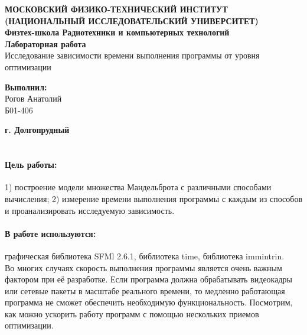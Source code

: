 \documentclass[12pt, letterpaper]{article}
\begin{document}
    \begin{titlepage}
        \begin{center}
            \large\textbf{МОСКОВСКИЙ ФИЗИКО-ТЕХНИЧЕСКИЙ ИНСТИТУТ (НАЦИОНАЛЬНЫЙ ИССЛЕДОВАТЕЛЬСКИЙ УНИВЕРСИТЕТ)}\\
            \large\textbf{Физтех-школа Радиотехники и компьютерных технологий}\\
            \vspace{8cm} 
            \Large\textbf{Лабораторная работа}\\
            \large{Исследование зависимости времени выполнения программы от уровня оптимизации}\\
            \vspace{5cm}
        \end{center}
        \begin{flushright}
            \large\textbf{Выполнил:}\\
            \large{Рогов Анатолий}\\
            \large{Б01-406}\\
        \end{flushright}
        \begin{center}
            \vfill
            \large\textbf{г. Долгопрудный}\\
            \large\textbf{\the \year}\\
        \end{center}
    \end{titlepage}
    
    \paragraph{Цель работы:}1) построение модели множества Мандельброта с различными способами вычисления; 2) измерение времени выполнения программы с каждым из способов и проанализировать исследуемую зависимость.
    \paragraph{В работе используются:}графическая библиотека SFMl 2.6.1, библиотека time, библиотека immintrin.\\

    Во многих случаях скорость выполнения программы является очень важным фактором при её разработке. Если программа должна обрабатывать видеокадры или сетевые пакеты в масштабе реального времени, то медленно работающая программа не сможет обеспечить необходимую функциональность. Посмотрим, как можно ускорить работу программ с помощью нескольких приемов оптимизации.
    
\end{document}
